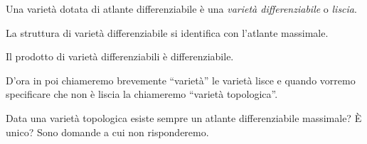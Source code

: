 \begin{defn}
	Una varietà dotata di atlante differenziabile è una \emph{varietà differenziabile} o \emph{liscia}.
\end{defn}

\begin{oss}
	La struttura di varietà differenziabile si identifica con l'atlante massimale.
\end{oss}

\begin{fat}
	Il prodotto di varietà differenziabili è differenziabile.
\end{fat}

D'ora in poi chiameremo brevemente ``varietà'' le varietà lisce
e quando vorremo specificare che non è liscia la chiameremo ``varietà topologica''.

Data una varietà topologica esiste sempre un atlante differenziabile massimale? È unico?
Sono domande a cui non risponderemo.
